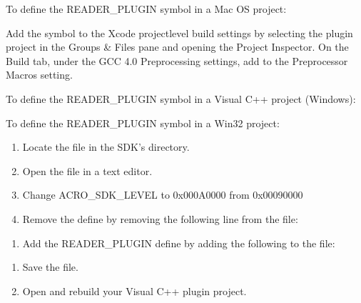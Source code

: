 \documentclass[letterpaper,12pt,english,openany,oneside]{sphinxmanual}
\begin{document}
To define the READER\_PLUGIN symbol in a Mac OS project:

Add the  symbol to the Xcode project\sphinxhyphen{}level build settings by selecting the plugin project in the Groups \& Files pane and opening the Project Inspector. On the Build tab, under the GCC 4.0 Preprocessing settings, add  to the Preprocessor Macros setting.

To define the READER\_PLUGIN symbol in a Visual C++ project (Windows):

To define the READER\_PLUGIN symbol in a Win32 project:
\begin{enumerate}
%
\item {} 
Locate the  file in the SDK’s  directory.

\item {} 
Open the  file in a text editor.

\item {} 
Change ACRO\_SDK\_LEVEL to 0x000A0000 from 0x00090000

\item {} 
Remove the  define by removing the following line from the file:

\end{enumerate}

\begin{enumerate}
%
\setcounter{enumi}{4}
\item {} 
Add the READER\_PLUGIN define by adding the following to the file:

\end{enumerate}

\begin{enumerate}
%
\setcounter{enumi}{5}
\item {} 
Save the  file.

\item {} 
Open and rebuild your Visual C++ plugin project.

\end{enumerate}
\end{document}
